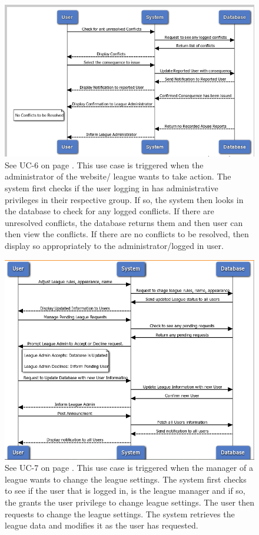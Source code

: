 \begin{figure}[H]
\centering
\includegraphics[width=5.5in]{./img/uc6.png}
\caption{See UC-6 on page \pageref{UC-6}. This use case is triggered when the
administrator of the website/ league wants
to take action. The system first checks if the user logging in has administrative
privileges in their respective group. If so, the system then looks in the database
to check for any logged conflicts. If there are unresolved conflicts, the database
returns them and then user can then view the conflicts. If there are no conflicts to
be resolved, then display so appropriately to the administrator/logged in user.}
\end{figure}

\begin{figure}[H]
\centering
\includegraphics[width=5.5in]{./img/uc7.png}
\caption{See UC-7 on page \pageref{UC-7}. This use case is triggered when the
manager of a league wants to change the league
settings. The system first checks to see if the user that is logged in, is the league
manager and if so, the grants the user privilege to change league settings. The user
then requests to change the league settings. The system retrieves the league data
and modifies it as the user has requested.}
\end{figure}

